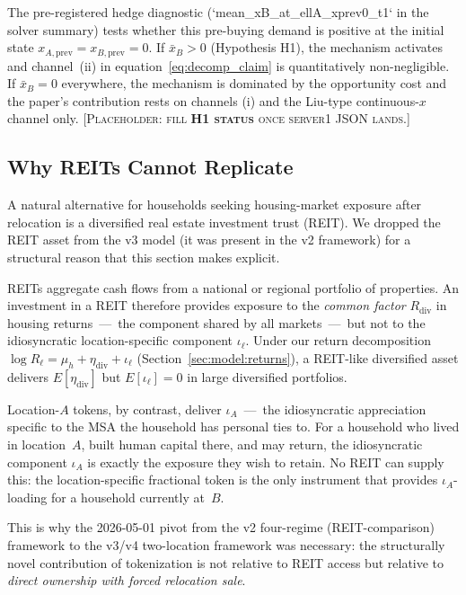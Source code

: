 The pre-registered hedge diagnostic (`mean_xB_at_ellA_xprev0_t1` in the solver
summary) tests whether this pre-buying demand is positive at the initial state
$x_{A,\text{prev}} = x_{B,\text{prev}} = 0$.
If $\bar{x}_B > 0$ (Hypothesis H1), the mechanism activates and channel~(ii)
in equation~\eqref{eq:decomp_claim} is quantitatively non-negligible.
If $\bar{x}_B = 0$ everywhere, the mechanism is dominated by the opportunity
cost and the paper's contribution rests on channels (i) and the Liu-type
continuous-$x$ channel only.
[\textsc{Placeholder: fill \textbf{H1 status} once server1 JSON lands.}]

\subsection{Why REITs Cannot Replicate}
\label{sec:discussion:reit}

A natural alternative for households seeking housing-market exposure after
relocation is a diversified real estate investment trust (REIT).
We dropped the REIT asset from the v3 model (it was present in the v2 framework)
for a structural reason that this section makes explicit.

REITs aggregate cash flows from a national or regional portfolio of properties.
An investment in a REIT therefore provides exposure to the \emph{common factor}
$R_{\text{div}}$ in housing returns~---~the component shared by all markets~---~but
not to the idiosyncratic location-specific component $\iota_\ell$.
Under our return decomposition
$\log R_\ell = \mu_h + \eta_{\text{div}} + \iota_\ell$
(Section~\ref{sec:model:returns}), a REIT-like diversified asset delivers
$E[\eta_{\text{div}}]$ but $E[\iota_\ell] = 0$ in large diversified portfolios.

Location-$A$ tokens, by contrast, deliver $\iota_A$~---~the idiosyncratic
appreciation specific to the MSA the household has personal ties to.
For a household who lived in location~$A$, built human capital there, and
may return, the idiosyncratic component $\iota_A$ is exactly the exposure
they wish to retain.
No REIT can supply this:
the location-specific fractional token is the only instrument that provides
$\iota_A$-loading for a household currently at~$B$.

This is why the 2026-05-01 pivot from the v2 four-regime (REIT-comparison)
framework to the v3/v4 two-location framework was necessary: the
structurally novel contribution of tokenization is not relative to REIT access
but relative to \emph{direct ownership with forced relocation sale}.

